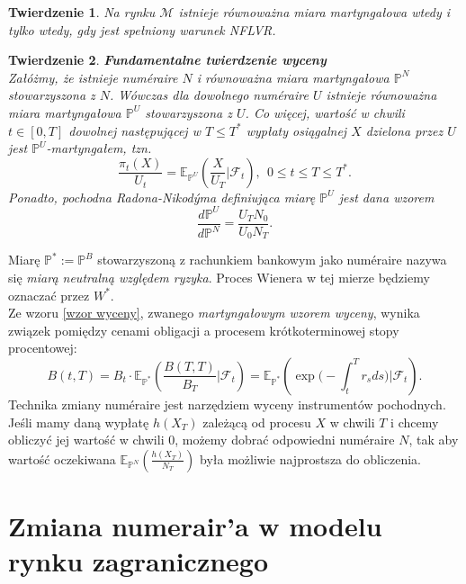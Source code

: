\documentclass{mini}
\theoremstyle{mythstyle}
\newtheorem{Twierdzenie}{Twierdzenie}[chapter]
\begin{document}
\begin{Twierdzenie}
	Na rynku $\mathcal{M}$ istnieje równoważna miara martyngałowa wtedy
	i tylko wtedy, gdy jest spełniony warunek NFLVR.\\
\end{Twierdzenie}
\begin{Twierdzenie}\textbf{Fundamentalne twierdzenie wyceny}\\
	Załóżmy, że istnieje num\'{e}raire $N$ i równoważna miara
	martyngałowa $\mathbb{P}^N$ stowarzyszona z $N$. Wówczas dla
	dowolnego num\'{e}raire $U$ istnieje równoważna miara martyngałowa
	$\mathbb{P}^U$ stowarzyszona z $U$. Co więcej, wartość w chwili
	$t\in [0,T]$ dowolnej następującej w $T \leq T^*$ wypłaty osiągalnej $X$
	dzielona przez $U$ jest $\mathbb{P}^U$-martyngałem, tzn.
	\begin{equation} \label{wzor wyceny}
	\frac{\pi_t(X)}{U_t}=\mathbb{E}_{\mathbb{P}^U}
	\left(\frac{X}{U_T} \bigg| \mathcal{F}_t\right), \ \ 0\leq t \leq T \leq T^*.
	\end{equation}
	Ponadto, pochodna Radona-Nikod\'{y}ma definiująca miarę $\mathbb{P}^U$
	jest dana wzorem
	\begin{equation} \label{Radon-Nikodym}
	\frac{d\mathbb{P}^U}{d\mathbb{P}^N}=\frac{U_T N_0}{U_0 N_T}.
	\end{equation}
\end{Twierdzenie}
Miarę $\mathbb{P}^* := \mathbb{P}^B$ stowarzyszoną z rachunkiem
bankowym jako num\'{e}raire nazywa się \textit{miarą neutralną względem
	ryzyka}. Proces Wienera w tej mierze będziemy oznaczać przez $W^*$.\\ \indent
Ze wzoru \eqref{wzor wyceny}, zwanego \emph{martyngałowym wzorem wyceny}, wynika związek pomiędzy cenami obligacji a procesem krótkoterminowej stopy procentowej:
\begin{equation*}
 B(t,T)=B_t \cdot \mathbb{E}_{\mathbb{P}^*}
 \left(\frac{B(T,T)}{B_T} \bigg| \mathcal{F}_t\right)=\mathbb{E}_{\mathbb{P}^*}
 \left(\exp\bigg(-\int_t^T r_sds\bigg) \bigg|\mathcal{F}_t\right).
\end{equation*}
Technika zmiany num\'{e}raire jest narzędziem wyceny instrumentów pochodnych. Jeśli mamy daną wypłatę $h(X_T)$ zależącą od procesu $X$ w chwili $T$ i chcemy obliczyć jej wartość w chwili 0, możemy dobrać odpowiedni num\'{e}raire $N$, tak aby wartość oczekiwana $\mathbb{E}_{\mathbb{P}^N} \left(\frac{h(X_T)}{N_T}\right)$ była możliwie najprostsza do obliczenia. 

\section{Zmiana numerair'a w modelu rynku zagranicznego}
\end{document}

